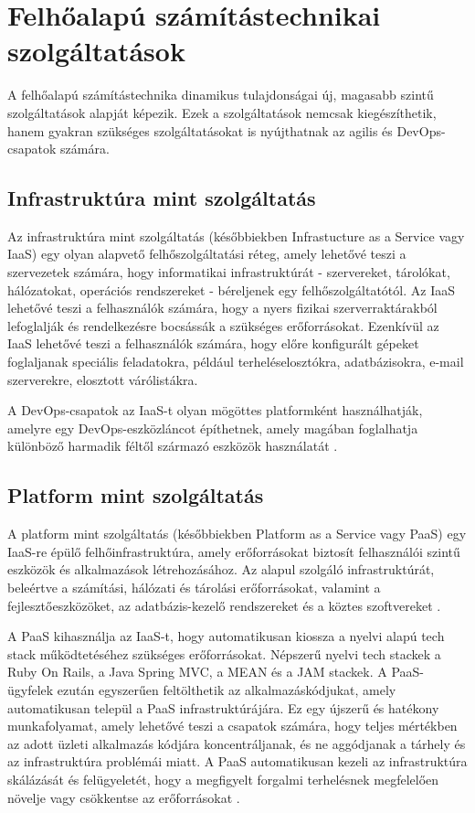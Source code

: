 \newpage

\section{Felhőalapú számítástechnikai szolgáltatások}
A felhőalapú számítástechnika dinamikus tulajdonságai új, magasabb szintű szolgáltatások alapját képezik.
Ezek a szolgáltatások nemcsak kiegészíthetik, hanem gyakran szükséges szolgáltatásokat is nyújthatnak az agilis és DevOps-csapatok számára.

\subsection{Infrastruktúra mint szolgáltatás}
Az infrastruktúra mint szolgáltatás (későbbiekben Infrastucture as a Service vagy IaaS) egy olyan alapvető felhőszolgáltatási réteg, amely lehetővé teszi a szervezetek számára, hogy informatikai infrastruktúrát - szervereket, tárolókat, hálózatokat, operációs rendszereket - béreljenek egy felhőszolgáltatótól.
Az IaaS lehetővé teszi a felhasználók számára, hogy a nyers fizikai szerverraktárakból lefoglalják és rendelkezésre bocsássák a szükséges erőforrásokat. Ezenkívül az IaaS lehetővé teszi a felhasználók számára, hogy előre konfigurált gépeket foglaljanak speciális feladatokra, például terheléselosztókra, adatbázisokra, e-mail szerverekre, elosztott várólistákra.

A DevOps-csapatok az IaaS-t olyan mögöttes platformként használhatják, amelyre egy DevOps-eszközláncot építhetnek, amely magában foglalhatja különböző harmadik féltől származó eszközök használatát \cite{cloudComp}.

\subsection{Platform mint szolgáltatás}
A platform mint szolgáltatás (későbbiekben Platform as a Service vagy PaaS) egy IaaS-re épülő felhőinfrastruktúra, amely erőforrásokat biztosít felhasználói szintű eszközök és alkalmazások létrehozásához.
Az alapul szolgáló infrastruktúrát, beleértve a számítási, hálózati és tárolási erőforrásokat, valamint a fejlesztőeszközöket, az adatbázis-kezelő rendszereket és a köztes szoftvereket \cite{cloudComp}.

A PaaS kihasználja az IaaS-t, hogy automatikusan kiossza a nyelvi alapú tech stack működtetéséhez szükséges erőforrásokat.
Népszerű nyelvi tech stackek a Ruby On Rails, a Java Spring MVC, a MEAN és a JAM stackek. A PaaS-ügyfelek ezután egyszerűen feltölthetik az alkalmazáskódjukat, amely automatikusan települ a PaaS infrastruktúrájára.
Ez egy újszerű és hatékony munkafolyamat, amely lehetővé teszi a csapatok számára, hogy teljes mértékben az adott üzleti alkalmazás kódjára koncentráljanak, és ne aggódjanak a tárhely és az infrastruktúra problémái miatt.
A PaaS automatikusan kezeli az infrastruktúra skálázását és felügyeletét, hogy a megfigyelt forgalmi terhelésnek megfelelően növelje vagy csökkentse az erőforrásokat \cite{cloudComp}.


